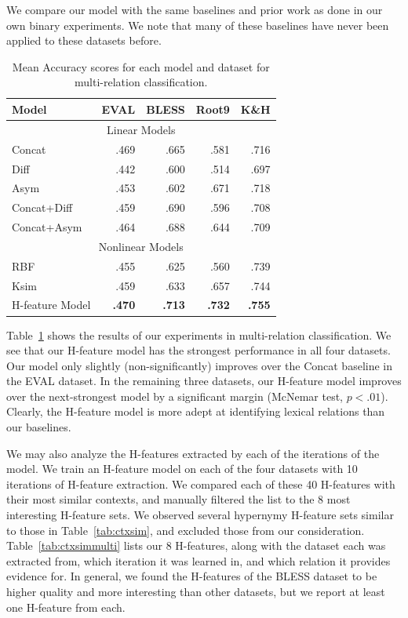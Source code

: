 We compare our model with the same baselines and prior work as done in our own
binary experiments. We note that many of these baselines have never been
applied to these datasets before.

\begin{table}
\centering
\begin{tabular}{|l|rrrr|}
  \hline
  {\bf Model}      & {\bf EVAL}  & {\bf BLESS} & {\bf Root9} & {\bf K\&H}  \\
  \hline
  \hline
  \multicolumn{5}{|c|}{Linear Models}\\
  \hline
  Concat           &      .469   &      .665   &      .581     &      .716   \\
  Diff             &      .442   &      .600   &      .514     &      .697   \\
  Asym             &      .453   &      .602   &      .671     &      .718   \\
  Concat+Diff      &      .459   &      .690   &      .596     &      .708   \\
  Concat+Asym      &      .464   &      .688   &      .644     &      .709   \\
  \hline
  \multicolumn{5}{|c|}{Nonlinear Models}\\
  \hline
  RBF              &      .455   &      .625   &      .560     &      .739   \\
  Ksim             &      .459   &      .633   &      .657     &      .744   \\
  H-feature Model  &  {\bf.470}  &  {\bf.713}  &  {\bf.732}    &  {\bf.755}  \\
  \hline
\end{tabular}
\caption{Mean Accuracy scores for each model and dataset for multi-relation classification.}
\label{tab:multiresults}
\end{table}

Table~\ref{tab:multiresults} shows the results of our experiments in
multi-relation classification. We see that our H-feature model has the
strongest performance in all four datasets. Our model only slightly
(non-significantly) improves over the Concat baseline in the EVAL dataset.
In the remaining three datasets, our H-feature model improves over the
next-strongest model by a significant margin (McNemar test, $p < .01$).
Clearly, the H-feature model is more adept at identifying lexical relations
than our baselines.

We may also analyze the H-features extracted by each of the iterations of the
model. We train an H-feature model on each of the four datasets with 10
iterations of H-feature extraction. We compared each of these 40 H-features
with their most similar contexts, and manually filtered the list to the
8 most interesting H-feature sets. We observed several hypernymy H-feature
sets similar to those in Table~\ref{tab:ctxsim}, and excluded those from our
consideration.
Table~\ref{tab:ctxsimmulti} lists our 8 H-features, along with the dataset
each was extracted from, which iteration it was learned in, and which relation
it provides evidence for. In general, we found the H-features of the BLESS
dataset to be higher quality and more interesting than other datasets, but
we report at least one H-feature from each.

